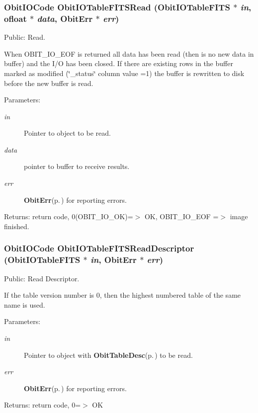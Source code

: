 \subsubsection{\setlength{\rightskip}{0pt plus 5cm}Obit\-IOCode Obit\-IOTable\-FITSRead ({\bf Obit\-IOTable\-FITS} $\ast$ {\em in}, {\bf ofloat} $\ast$ {\em data}, {\bf Obit\-Err} $\ast$ {\em err})}\label{ObitIOTableFITS_8c_a22}


Public: Read. 

When OBIT\_\-IO\_\-EOF is returned all data has been read (then is no new data in buffer) and the I/O has been closed. If there are existing rows in the buffer marked as modified (\char`\"{}\_\-status\char`\"{} column value =1) the buffer is rewritten to disk before the new buffer is read. \begin{Desc}
\item[Parameters:]
\begin{description}
\item[{\em in}]Pointer to object to be read. \item[{\em data}]pointer to buffer to receive results. \item[{\em err}]{\bf Obit\-Err}{\rm (p.\,\pageref{structObitErr})} for reporting errors. \end{description}
\end{Desc}
\begin{Desc}
\item[Returns:]return code, 0(OBIT\_\-IO\_\-OK)=$>$ OK, OBIT\_\-IO\_\-EOF =$>$ image finished. \end{Desc}
\subsubsection{\setlength{\rightskip}{0pt plus 5cm}Obit\-IOCode Obit\-IOTable\-FITSRead\-Descriptor ({\bf Obit\-IOTable\-FITS} $\ast$ {\em in}, {\bf Obit\-Err} $\ast$ {\em err})}\label{ObitIOTableFITS_8c_a27}


Public: Read Descriptor. 

If the table version number is 0, then the highest numbered table of the same name is used. \begin{Desc}
\item[Parameters:]
\begin{description}
\item[{\em in}]Pointer to object with {\bf Obit\-Table\-Desc}{\rm (p.\,\pageref{structObitTableDesc})} to be read. \item[{\em err}]{\bf Obit\-Err}{\rm (p.\,\pageref{structObitErr})} for reporting errors. \end{description}
\end{Desc}
\begin{Desc}
\item[Returns:]return code, 0=$>$ OK \end{Desc}
